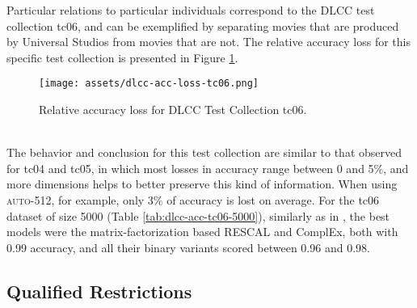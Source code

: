 \documentclass[11pt,titlepage,oneside,openany]{book}
\begin{document}
Particular relations to particular individuals correspond to the DLCC test collection tc06, and can be exemplified by separating movies that are produced by Universal Studios from movies that are not. The relative accuracy loss for this specific test collection is presented in Figure \ref{fig:dlcc-acc-loss-tc06}.\\
\begin{figure}[h!]
    \centering
    \centerline{\texttt{[image: assets/dlcc-acc-loss-tc06.png]}}
    \vspace*{-3mm}
    \caption{Relative accuracy loss for DLCC Test Collection tc06.}
    \label{fig:dlcc-acc-loss-tc06}
\end{figure}
\\
The behavior and conclusion for this test collection are similar to that observed for tc04 and tc05, in which most losses in accuracy range between 0 and 5\%, and more dimensions helps to better preserve this kind of information. When using \textsc{auto-512}, for example, only 3\% of accuracy is lost on average. For the tc06 dataset of size 5000 (Table \ref{tab:dlcc-acc-tc06-5000}), similarly as in \cite{ristoski_rdf2vec_2019}, the best models were the matrix-factorization based RESCAL and ComplEx, both with 0.99 accuracy, and all their binary variants scored between 0.96 and 0.98.

\subsection{Qualified Restrictions}
\label{subsubsec:tc07-tc08}
\end{document}
